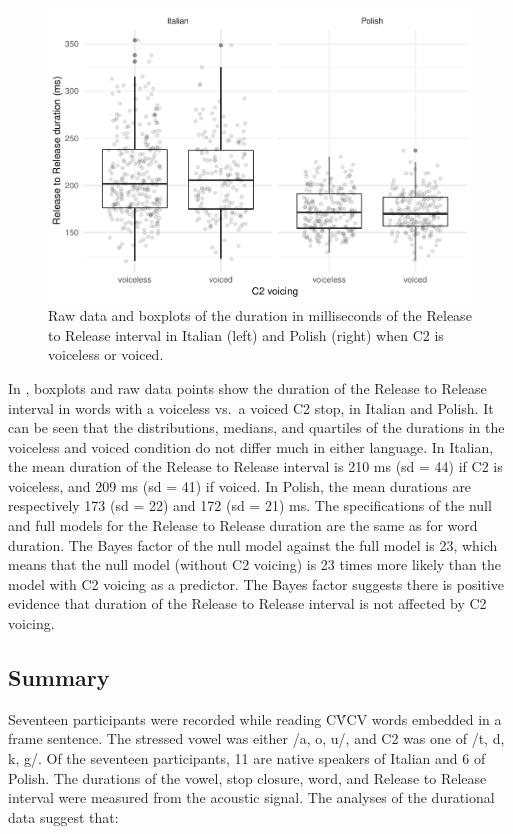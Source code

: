\documentclass[preprint]{JASAnew}
\begin{document}
\begin{figure}
\includegraphics[width=\linewidth]{Figure5} \caption{Raw data and boxplots of the duration in milliseconds of the Release to Release interval in Italian (left) and Polish (right) when C2 is voiceless or voiced.}\label{f:Figure5}
\end{figure}

In , boxplots and raw data points show the duration of
the Release to Release interval in words with a voiceless vs.~a voiced
C2 stop, in Italian and Polish. It can be seen that the distributions,
medians, and quartiles of the durations in the voiceless and voiced
condition do not differ much in either language. In Italian, the mean
duration of the Release to Release interval is 210 ms (sd = 44) if C2 is
voiceless, and 209 ms (sd = 41) if voiced. In Polish, the mean durations
are respectively 173 (sd = 22) and 172 (sd = 21) ms. The specifications
of the null and full models for the Release to Release duration are the
same as for word duration. The Bayes factor of the null model against
the full model is 23, which means that the null model (without C2
voicing) is 23 times more likely than the model with C2 voicing as a
predictor. The Bayes factor suggests there is positive evidence that
duration of the Release to Release interval is not affected by C2
voicing.

\subsection{Summary}\label{summary}

Seventeen participants were recorded while reading CV́CV words embedded
in a frame sentence. The stressed vowel was either /a, o, u/, and C2 was
one of /t, d, k, g/. Of the seventeen participants, 11 are native
speakers of Italian and 6 of Polish. The durations of the vowel, stop
closure, word, and Release to Release interval were measured from the
acoustic signal. The analyses of the durational data suggest that:
\end{document}
